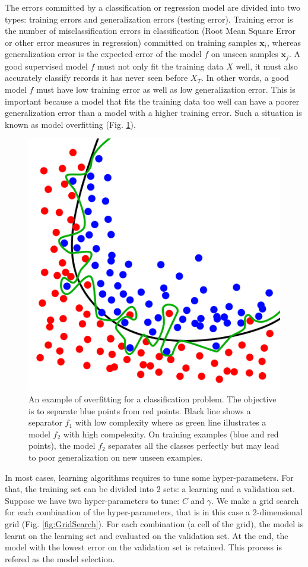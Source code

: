 The errors committed by a classification or regression model are divided into two types: training errors and generalization errors (testing error). Training error is the number of misclassification errors in classification (Root Mean Square Error or other error measures in regression) committed on training samples $\textbf{x}_i$, whereas generalization error is the expected error of the model $f$ on unseen samples $\textbf{x}_j$. A good supervised model $f$ must not only fit the training data $X$ well, it must also accurately classify records it has never seen before $X_T$. In other words, a good model $f$ must have low training error as well as low generalization error. This is important because a model that fits the training data too well can have a poorer generalization error than a model with a higher training error. Such a situation is known as model overfitting (Fig. \ref{fig:Overfitting}).

\begin{figure}[h!]
\centering
\includegraphics[width=0.4\linewidth]{images/Overfitting}
\caption{An example of overfitting for a classification problem. The objective is to separate blue points from red points. Black line shows a separator $f_1$ with low complexity where as green line illustrates a model $f_2$ with high compelexity. On training examples (blue and red points), the model $f_2$ separates all the classes perfectly but may lead to poor generalization on new unseen examples. }
\label{fig:Overfitting}
\end{figure}

In most cases, learning algorithms requires to tune some hyper-parameters. For that, the training set can be divided into 2 sets: a learning and a validation set. Suppose we have two hyper-parameters to tune: $C$ and $\gamma$. We make a grid search for each combination of the hyper-parameters, that is in this case a 2-dimensional grid (Fig. \ref{fig:GridSearch}). For each combination (a cell of the grid), the model is learnt on the learning set and evaluated on the validation set. At the end, the model with the lowest error on the validation set is retained. This process is refered as the model selection. 

